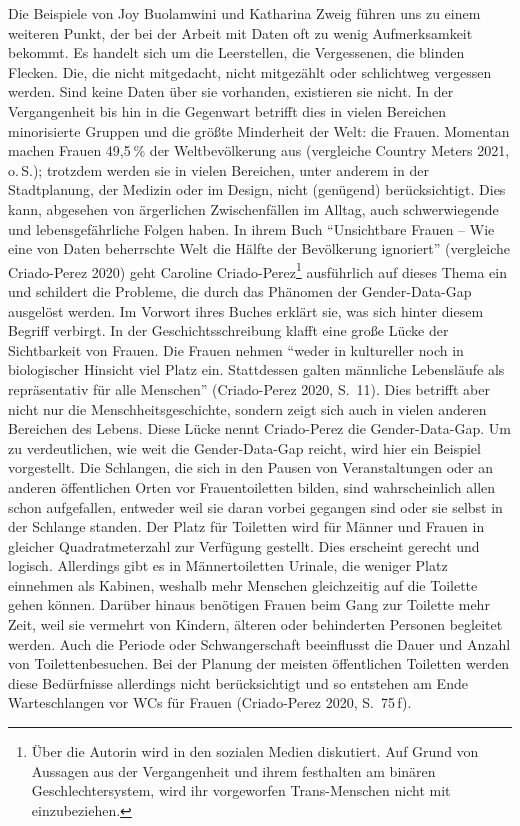 \documentclass[a4paper,
fontsize=11pt,
oneside,
numbers=noperiodatend,
parskip=half-,
bibliography=totoc,
final
]{scrartcl}
\begin{document}
Die Beispiele von Joy Buolamwini und Katharina Zweig führen uns zu einem
weiteren Punkt, der bei der Arbeit mit Daten oft zu wenig Aufmerksamkeit
bekommt. Es handelt sich um die Leerstellen, die Vergessenen, die
blinden Flecken. Die, die nicht mitgedacht, nicht mitgezählt oder
schlichtweg vergessen werden. Sind keine Daten über sie vorhanden,
existieren sie nicht. In der Vergangenheit bis hin in die Gegenwart
betrifft dies in vielen Bereichen minorisierte Gruppen und die größte
Minderheit der Welt: die Frauen. Momentan machen Frauen 49,5 \% der
Weltbevölkerung aus (vergleiche Country Meters 2021, o.\,S.); trotzdem werden
sie in vielen Bereichen, unter anderem in der Stadtplanung, der Medizin
oder im Design, nicht (genügend) berücksichtigt. Dies kann, abgesehen
von ärgerlichen Zwischenfällen im Alltag, auch schwerwiegende und
lebensgefährliche Folgen haben. In ihrem Buch \enquote{Unsichtbare
Frauen -- Wie eine von Daten beherrschte Welt die Hälfte der Bevölkerung
ignoriert} (vergleiche Criado-Perez 2020) geht Caroline
Criado-Perez\footnote{Über die Autorin wird in den sozialen Medien
  diskutiert. Auf Grund von Aussagen aus der Vergangenheit und ihrem
  festhalten am binären Geschlechtersystem, wird ihr vorgeworfen
  Trans-Menschen nicht mit einzubeziehen.} ausführlich auf dieses Thema
ein und schildert die Probleme, die durch das Phänomen der
Gender-Data-Gap ausgelöst werden. Im Vorwort ihres Buches erklärt sie,
was sich hinter diesem Begriff verbirgt. In der Geschichtsschreibung
klafft eine große Lücke der Sichtbarkeit von Frauen. Die Frauen nehmen
\enquote{weder in kultureller noch in biologischer Hinsicht viel Platz
ein. Stattdessen galten männliche Lebensläufe als repräsentativ für alle
Menschen} (Criado-Perez 2020, S.~11). Dies betrifft aber nicht nur die
Menschheitsgeschichte, sondern zeigt sich auch in vielen anderen
Bereichen des Lebens. Diese Lücke nennt Criado-Perez die
Gender-Data-Gap. Um zu verdeutlichen, wie weit die Gender-Data-Gap
reicht, wird hier ein Beispiel vorgestellt. Die Schlangen, die sich in
den Pausen von Veranstaltungen oder an anderen öffentlichen Orten vor
Frauentoiletten bilden, sind wahrscheinlich allen schon aufgefallen,
entweder weil sie daran vorbei gegangen sind oder sie selbst in der
Schlange standen. Der Platz für Toiletten wird für Männer und Frauen in
gleicher Quadratmeterzahl zur Verfügung gestellt. Dies erscheint gerecht
und logisch. Allerdings gibt es in Männertoiletten Urinale, die weniger
Platz einnehmen als Kabinen, weshalb mehr Menschen gleichzeitig auf die
Toilette gehen können. Darüber hinaus benötigen Frauen beim Gang zur
Toilette mehr Zeit, weil sie vermehrt von Kindern, älteren oder
behinderten Personen begleitet werden. Auch die Periode oder
Schwangerschaft beeinflusst die Dauer und Anzahl von Toilettenbesuchen.
Bei der Planung der meisten öffentlichen Toiletten werden diese
Bedürfnisse allerdings nicht berücksichtigt und so entstehen am Ende
Warteschlangen vor WCs für Frauen (Criado-Perez 2020, S.~75\,f).
\end{document}
